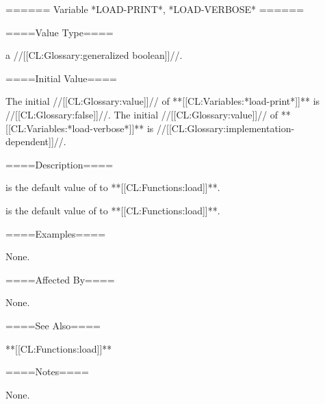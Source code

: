 ====== Variable *LOAD-PRINT*, *LOAD-VERBOSE* ======

====Value Type====

a //[[CL:Glossary:generalized boolean]]//.

====Initial Value====

The initial //[[CL:Glossary:value]]// of **[[CL:Variables:*load-print*]]** is //[[CL:Glossary:false]]//. The initial //[[CL:Glossary:value]]// of **[[CL:Variables:*load-verbose*]]** is //[[CL:Glossary:implementation-dependent]]//.

====Description====

 is the default value of  to **[[CL:Functions:load]]**.

 is the default value of  to **[[CL:Functions:load]]**.

====Examples====

None.

====Affected By====

None.

====See Also====

**[[CL:Functions:load]]**

====Notes====

None.

